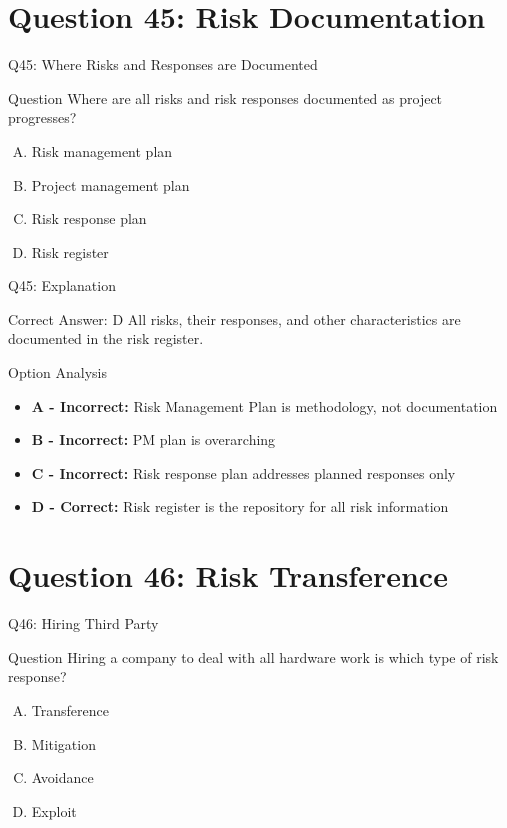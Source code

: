 \documentclass{beamer}
\begin{document}
	\section{Question 45: Risk Documentation}
	
	\begin{frame}{Q45: Where Risks and Responses are Documented}
		\begin{block}{Question}
			Where are all risks and risk responses documented as project progresses?
		\end{block}
		\begin{enumerate}[(A)]
			\item Risk management plan
			\item Project management plan
			\item Risk response plan
			\item Risk register
		\end{enumerate}
	\end{frame}
	
	\begin{frame}{Q45: Explanation}
		\begin{block}{Correct Answer: D}
			All risks, their responses, and other characteristics are documented in the risk register.
		\end{block}
		\begin{block}{Option Analysis}
			\begin{itemize}
				\item \textbf{A - Incorrect:} Risk Management Plan is methodology, not documentation
				\item \textbf{B - Incorrect:} PM plan is overarching
				\item \textbf{C - Incorrect:} Risk response plan addresses planned responses only
				\item \textbf{D - Correct:} Risk register is the repository for all risk information
			\end{itemize}
		\end{block}
	\end{frame}
	
	\section{Question 46: Risk Transference}
	
	\begin{frame}{Q46: Hiring Third Party}
		\begin{block}{Question}
			Hiring a company to deal with all hardware work is which type of risk response?
		\end{block}
		\begin{enumerate}[(A)]
			\item Transference
			\item Mitigation
			\item Avoidance
			\item Exploit
		\end{enumerate}
	\end{frame}
	
\end{document}
